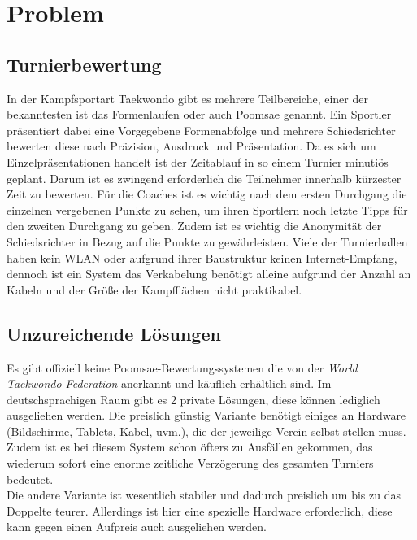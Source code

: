 \section{Problem}
\subsection{Turnierbewertung}
In der Kampfsportart Taekwondo gibt es mehrere Teilbereiche, einer der bekanntesten ist das Formenlaufen oder auch Poomsae genannt. Ein Sportler präsentiert dabei eine Vorgegebene Formenabfolge und mehrere Schiedsrichter bewerten diese nach Präzision, Ausdruck und Präsentation. Da es sich um Einzelpräsentationen handelt ist der Zeitablauf in so einem Turnier minutiös geplant. Darum ist es zwingend erforderlich die Teilnehmer innerhalb kürzester Zeit zu bewerten. Für die Coaches ist es wichtig nach dem ersten Durchgang die einzelnen vergebenen Punkte zu sehen, um ihren Sportlern noch letzte Tipps für den zweiten Durchgang zu geben. Zudem ist es wichtig die Anonymität der Schiedsrichter in Bezug auf die Punkte zu  gewährleisten. 
Viele der Turnierhallen haben kein WLAN oder aufgrund ihrer Baustruktur keinen Internet-Empfang, dennoch ist ein System das Verkabelung benötigt alleine aufgrund der Anzahl an Kabeln und der Größe der Kampfflächen nicht praktikabel.
	
\subsection{Unzureichende Lösungen}
Es gibt offiziell keine Poomsae-Bewertungssystemen die von der \emph{World Taekwondo Federation} anerkannt und käuflich erhältlich sind. Im deutschsprachigen Raum gibt es 2 private Lösungen, diese können lediglich ausgeliehen werden. 
Die preislich günstig Variante benötigt einiges an Hardware (Bildschirme, Tablets, Kabel, uvm.), die der jeweilige Verein selbst stellen muss. Zudem ist es bei diesem System schon öfters zu Ausfällen gekommen, das wiederum sofort eine enorme zeitliche Verzögerung des gesamten Turniers bedeutet.\\
Die andere Variante ist wesentlich stabiler und dadurch preislich um bis zu das Doppelte teurer. Allerdings ist hier eine spezielle Hardware erforderlich, diese kann gegen einen Aufpreis auch ausgeliehen werden. 

